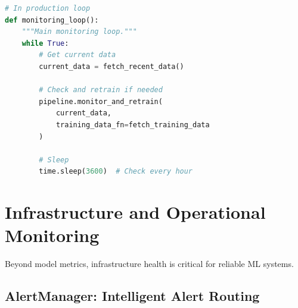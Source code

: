 \begin{lstlisting}[language=Python, caption={Retraining Pipeline with Triggers}]
# In production loop
def monitoring_loop():
    """Main monitoring loop."""
    while True:
        # Get current data
        current_data = fetch_recent_data()

        # Check and retrain if needed
        pipeline.monitor_and_retrain(
            current_data,
            training_data_fn=fetch_training_data
        )

        # Sleep
        time.sleep(3600)  # Check every hour
\end{lstlisting}

\section{Infrastructure and Operational Monitoring}

Beyond model metrics, infrastructure health is critical for reliable ML systems.

\subsection{AlertManager: Intelligent Alert Routing}

